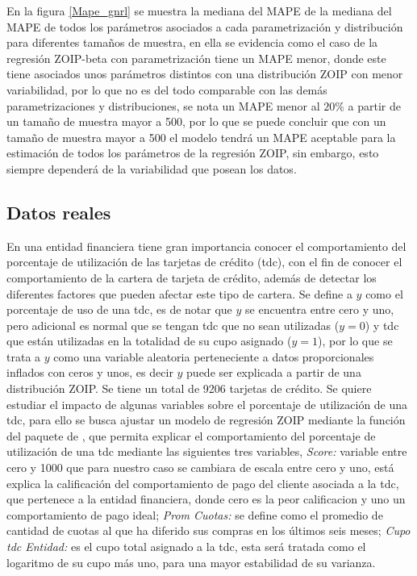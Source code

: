 En la figura \ref{Mape_gnrl} se muestra la mediana del MAPE de la mediana del MAPE de todos los par\'{a}metros asociados a cada parametrizaci\'{o}n y distribuci\'{o}n para diferentes tama\~{n}os de muestra, en ella se evidencia como el caso de la regresi\'{o}n ZOIP-beta con parametrizaci\'{o}n \cite{Stasinopoulos2} tiene un MAPE menor, donde este tiene asociados unos par\'{a}metros distintos con una distribuci\'{o}n ZOIP con menor variabilidad, por lo que no es del todo comparable con las dem\'{a}s parametrizaciones y distribuciones, se nota un MAPE menor al $20\%$ a partir de un tama\~{n}o de muestra mayor a 500, por lo que se puede concluir que con un tama\~{n}o de muestra mayor a 500 el modelo tendr\'{a} un MAPE aceptable para la estimaci\'{o}n de todos los par\'{a}metros de la regresi\'{o}n ZOIP, sin embargo, esto siempre depender\'{a} de la variabilidad que posean los datos.

\subsection{Datos reales}

En una entidad financiera tiene gran importancia conocer el comportamiento del porcentaje de utilizaci\'{o}n de las tarjetas de cr\'{e}dito (tdc), con el fin de conocer el comportamiento de la cartera de tarjeta de cr\'{e}dito, adem\'{a}s de detectar los diferentes factores que pueden afectar este tipo de cartera. Se define a $y$ como el porcentaje de uso de una tdc, es de notar que $y$ se encuentra entre cero y uno, pero adicional es normal que se tengan tdc que no sean utilizadas ($y=0$) y tdc que est\'{a}n utilizadas en la totalidad de su cupo asignado ($y=1$), por lo que se trata a $y$ como una variable aleatoria perteneciente a datos proporcionales inflados con ceros y unos, es decir $y$ puede ser explicada a partir de una distribuci\'{o}n ZOIP. Se tiene un total de 9206 tarjetas de cr\'{e}dito. Se quiere estudiar el impacto de algunas variables sobre el porcentaje de utilizaci\'{o}n de una tdc, para ello se busca ajustar un modelo de regresi\'{o}n ZOIP mediante la funci\'{o}n  del paquete  de , que permita explicar el comportamiento del porcentaje de utilizaci\'{o}n de una tdc mediante las siguientes tres variables, \textsl{Score:} variable entre cero y 1000 que para nuestro caso se cambiara de escala entre cero y uno, est\'{a} explica la calificaci\'{o}n del comportamiento de pago del cliente asociada a la tdc, que pertenece a la entidad financiera, donde cero es la peor calificacion y uno un comportamiento de pago ideal; \textsl{Prom Cuotas:} se define como el promedio de cantidad de cuotas al que ha diferido sus compras en los \'{u}ltimos seis meses; \textsl{Cupo tdc Entidad:} es el cupo total asignado a la tdc, esta ser\'{a} tratada como el logaritmo de su cupo m\'{a}s uno, para una mayor estabilidad de su varianza.\\

